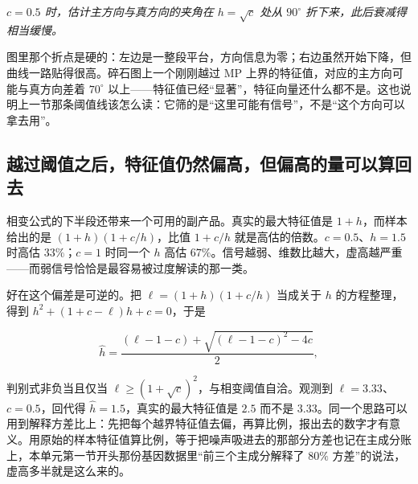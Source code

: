 \begin{center}
\end{center}

\emph{\(c=0.5\) 时，估计主方向与真方向的夹角在 \(h=\sqrt c\) 处从 \(90^\circ\) 折下来，此后衰减得相当缓慢。}

图里那个折点是硬的：左边是一整段平台，方向信息为零；右边虽然开始下降，但曲线一路贴得很高。碎石图上一个刚刚越过 MP 上界的特征值，对应的主方向可能与真方向差着 \(70^\circ\) 以上——特征值已经``显著''，特征向量还什么都不是。这也说明上一节那条阈值线该怎么读：它筛的是``这里可能有信号''，不是``这个方向可以拿去用''。

\subsection{越过阈值之后，特征值仍然偏高，但偏高的量可以算回去}

相变公式的下半段还带来一个可用的副产品。真实的最大特征值是 \(1+h\)，而样本给出的是 \((1+h)(1+c/h)\)，比值 \(1+c/h\) 就是高估的倍数。\(c=0.5\)、\(h=1.5\) 时高估 \(33\%\)；\(c=1\) 时同一个 \(h\) 高估 \(67\%\)。信号越弱、维数比越大，虚高越严重——而弱信号恰恰是最容易被过度解读的那一类。

好在这个偏差是可逆的。把 \(\ell=(1+h)(1+c/h)\) 当成关于 \(h\) 的方程整理，得到 \(h^2+(1+c-\ell)h+c=0\)，于是

\[
\widehat h=\frac{(\ell-1-c)+\sqrt{(\ell-1-c)^2-4c}}{2},
\]

判别式非负当且仅当 \(\ell\ge(1+\sqrt c)^2\)，与相变阈值自洽。观测到 \(\ell=3.33\)、\(c=0.5\)，回代得 \(\widehat h=1.5\)，真实的最大特征值是 \(2.5\) 而不是 \(3.33\)。同一个思路可以用到解释方差比上：先把每个越界特征值去偏，再算比例，报出去的数字才有意义。用原始的样本特征值算比例，等于把噪声吸进去的那部分方差也记在主成分账上，本单元第一节开头那份基因数据里``前三个主成分解释了 \(80\%\) 方差''的说法，虚高多半就是这么来的。


